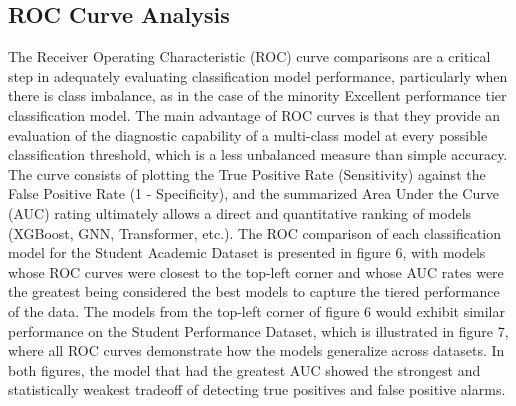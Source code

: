 \documentclass[twocolumn]{svjour3}
\begin{document}
\subsection{ROC Curve Analysis}
The Receiver Operating Characteristic (ROC) curve comparisons are a critical step in adequately evaluating classification model performance, particularly when there is class imbalance, as in the case of the minority Excellent performance tier classification model. The main advantage of ROC curves is that they provide an evaluation of the diagnostic capability of a multi-class model at every possible classification threshold, which is a less unbalanced measure than simple accuracy. The curve consists of plotting the True Positive Rate (Sensitivity) against the False Positive Rate (1 - Specificity), and the summarized Area Under the Curve (AUC) rating ultimately allows a direct and quantitative ranking of models (XGBoost, GNN, Transformer, etc.). The ROC comparison of each classification model for the Student Academic Dataset is presented in figure 6, with models whose ROC curves were closest to the top-left corner and whose AUC rates were the greatest being considered the best models to capture the tiered performance of the data. The models from the top-left corner of figure 6 would exhibit similar performance on the Student Performance Dataset, which is illustrated in figure 7, where all ROC curves demonstrate how the models generalize across datasets. In both figures, the model that had the greatest AUC showed the strongest and statistically weakest tradeoff of detecting true positives and false positive alarms.
\end{document}
